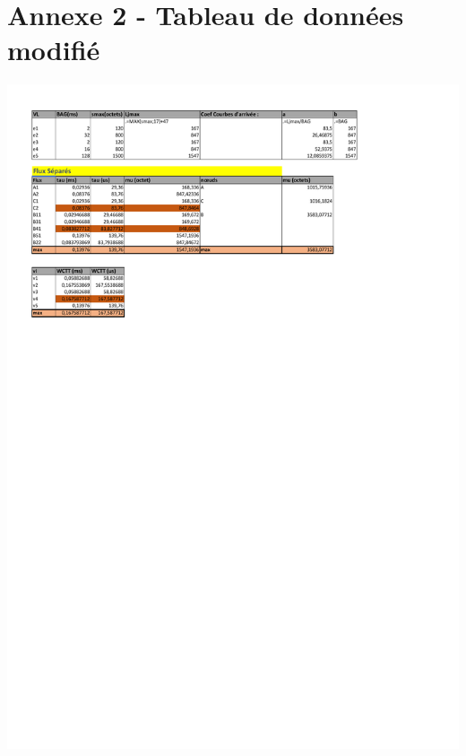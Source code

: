 \chapter*{Annexe 2 - Tableau de données modifié}
\label{Annex:Tableau de donnees modifie}
\begin{center}
\includegraphics[scale=.6]{./annexes/annexe2/calculsNetworkCalculus_modification.pdf}
\end{center}